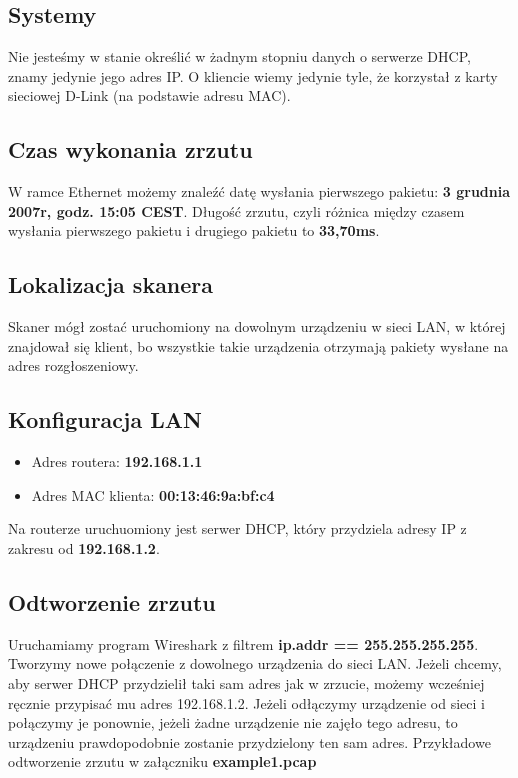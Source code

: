 \documentclass{article}
\begin{document}
\subsection{Systemy}
Nie jesteśmy w stanie określić w żadnym stopniu danych o serwerze DHCP, znamy jedynie jego adres IP.
O kliencie wiemy jedynie tyle, że korzystał z karty sieciowej D-Link (na podstawie adresu MAC).

\subsection{Czas wykonania zrzutu}
W ramce Ethernet możemy znaleźć datę wysłania pierwszego pakietu: \textbf{3 grudnia 2007r, godz. 15:05 CEST}.
Długość zrzutu, czyli różnica między czasem wysłania pierwszego pakietu i drugiego pakietu to \textbf{33,70ms}.

\subsection{Lokalizacja skanera}
Skaner mógł zostać uruchomiony na dowolnym urządzeniu w sieci LAN, w której znajdował się klient, bo wszystkie takie urządzenia
otrzymają pakiety wysłane na adres rozgłoszeniowy.

\subsection{Konfiguracja LAN}
\begin{itemize}
    \item Adres routera: \textbf{192.168.1.1}
    \item Adres MAC klienta: \textbf{00:13:46:9a:bf:c4}
\end{itemize}
Na routerze uruchuomiony jest serwer DHCP, który przydziela adresy IP z zakresu od \textbf{192.168.1.2}.

\subsection{Odtworzenie zrzutu}
Uruchamiamy program Wireshark z filtrem \textbf{ip.addr == 255.255.255.255}. Tworzymy nowe połączenie
z dowolnego urządzenia do sieci LAN. Jeżeli chcemy, aby serwer DHCP przydzielił taki sam adres jak w 
zrzucie, możemy wcześniej ręcznie przypisać mu adres 192.168.1.2. Jeżeli odłączymy urządzenie od sieci
i połączymy je ponownie, jeżeli żadne urządzenie nie zajęło tego adresu, to urządzeniu prawdopodobnie zostanie
przydzielony ten sam adres. Przykładowe odtworzenie zrzutu w załączniku \textbf{example1.pcap}
\end{document}
